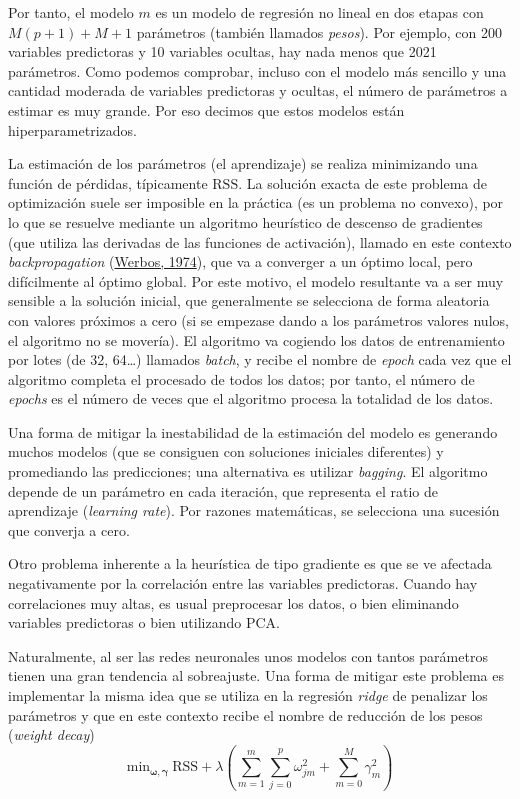 \documentclass[
  spanish,
]{book}
\theoremstyle{break}
\theoremstyle{definition}
\theoremstyle{definition}
\theoremstyle{definition}
\theoremstyle{definition}
\theoremstyle{remark}
\begin{document}
Por tanto, el modelo \(m\) es un modelo de regresión no lineal en dos etapas con \(M(p + 1) + M + 1\) parámetros (también llamados \emph{pesos}). Por ejemplo, con 200 variables predictoras y 10 variables ocultas, hay nada menos que 2021 parámetros. Como podemos comprobar, incluso con el modelo más sencillo y una cantidad moderada de variables predictoras y ocultas, el número de parámetros a estimar es muy grande. Por eso decimos que estos modelos están hiperparametrizados.

La estimación de los parámetros (el aprendizaje) se realiza minimizando una función de pérdidas, típicamente \(\mbox{RSS}\). La solución exacta de este problema de optimización suele ser imposible en la práctica (es un problema no convexo), por lo que se resuelve mediante un algoritmo heurístico de descenso de gradientes (que utiliza las derivadas de las funciones de activación), llamado en este contexto \emph{backpropagation} (\protect\hyperlink{ref-werbos1974new}{Werbos, 1974}), que va a converger a un óptimo local, pero difícilmente al óptimo global. Por este motivo, el modelo resultante va a ser muy sensible a la solución inicial, que generalmente se selecciona de forma aleatoria con valores próximos a cero (si se empezase dando a los parámetros valores nulos, el algoritmo no se movería). El algoritmo va cogiendo los datos de entrenamiento por lotes (de 32, 64\ldots) llamados \emph{batch}, y recibe el nombre de \emph{epoch} cada vez que el algoritmo completa el procesado de todos los datos; por tanto, el número de \emph{epochs} es el número de veces que el algoritmo procesa la totalidad de los datos.

Una forma de mitigar la inestabilidad de la estimación del modelo es generando muchos modelos (que se consiguen con soluciones iniciales diferentes) y promediando las predicciones; una alternativa es utilizar \emph{bagging}. El algoritmo depende de un parámetro en cada iteración, que representa el ratio de aprendizaje (\emph{learning rate}). Por razones matemáticas, se selecciona una sucesión que converja a cero.

Otro problema inherente a la heurística de tipo gradiente es que se ve afectada negativamente por la correlación entre las variables predictoras. Cuando hay correlaciones muy altas, es usual preprocesar los datos, o bien eliminando variables predictoras o bien utilizando PCA.

Naturalmente, al ser las redes neuronales unos modelos con tantos parámetros tienen una gran tendencia al sobreajuste. Una forma de mitigar este problema es implementar la misma idea que se utiliza en la regresión \emph{ridge} de penalizar los parámetros y que en este contexto recibe el nombre de reducción de los pesos (\emph{weight decay})
\[\mbox{min}_{\boldsymbol{\omega}, \boldsymbol{\gamma}}\ \mbox{RSS} + 
\lambda \left(\sum_{m=1}^m \sum_{j=0}^p \omega_{jm}^2 + \sum_{m=0}^M \gamma_m^2
\right)\]
\end{document}
